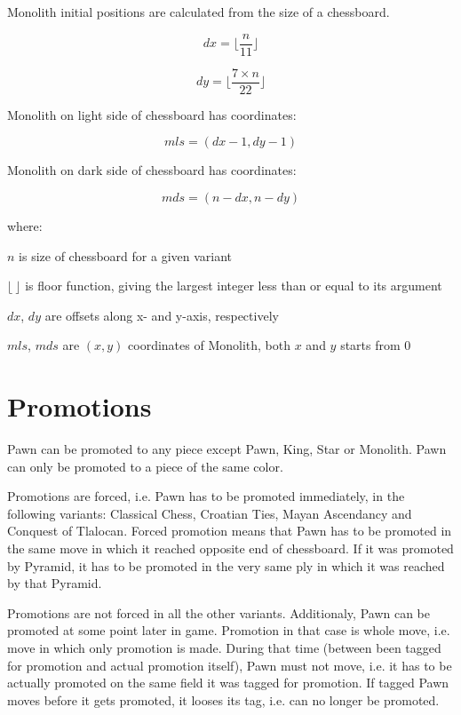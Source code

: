 Monolith initial positions are calculated from the size of a chessboard.

\begin{equation}
dx = \lfloor \frac{n}{11} \rfloor
\end{equation}

\begin{equation}
dy = \lfloor \frac{7 \times n}{22} \rfloor
\end{equation}

Monolith on light side of chessboard has coordinates:

\begin{equation}
mls = (dx - 1, dy - 1)
\end{equation}

Monolith on dark side of chessboard has coordinates:

\begin{equation}
mds = (n - dx, n - dy)
\end{equation}

where:

$n$ is size of chessboard for a given variant

$\lfloor\ \rfloor$ is floor function, giving the largest integer less than or equal to its argument

$dx$, $dy$ are offsets along x- and y-axis, respectively

$mls$, $mds$ are $(x, y)$ coordinates of Monolith, both $x$ and $y$ starts from $0$

\clearpage %

\section*{Promotions}
\label{sec:Definitions/Promotions}

Pawn can be promoted to any piece except Pawn, King, Star or Monolith.
Pawn can only be promoted to a piece of the same color.

Promotions are forced, i.e. Pawn has to be promoted immediately, in the following
variants: Classical Chess, Croatian Ties, Mayan Ascendancy and Conquest of Tlalocan.
Forced promotion means that Pawn has to be promoted in the same move in which it
reached opposite end of chessboard. If it was promoted by Pyramid, it has to be
promoted in the very same ply in which it was reached by that Pyramid.

Promotions are not forced in all the other variants. Additionaly, Pawn can be promoted
at some point later in game. Promotion in that case is whole move, i.e. move in which
only promotion is made. During that time (between been tagged for promotion and actual
promotion itself), Pawn must not move, i.e. it has to be actually promoted on the same
field it was tagged for promotion. If tagged Pawn moves before it gets promoted, it
looses its tag, i.e. can no longer be promoted.

